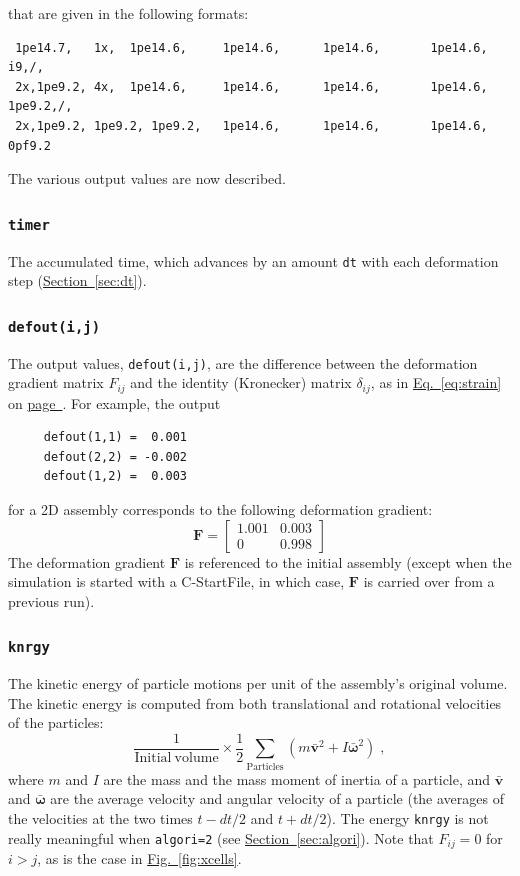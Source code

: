\documentclass[letterpaper,11pt]{article}
\newcommand{\StartFile}{\textsf{StartFile}}
\begin{document}
\normalsize\normalfont
\rule{0ex}{3ex}that are given in the following formats:\\[-2ex]
\footnotesize\normalfont
\begin{verbatim}
 1pe14.7,   1x,  1pe14.6,     1pe14.6,      1pe14.6,       1pe14.6,       i9,/,
 2x,1pe9.2, 4x,  1pe14.6,     1pe14.6,      1pe14.6,       1pe14.6,   1pe9.2,/,
 2x,1pe9.2, 1pe9.2, 1pe9.2,   1pe14.6,      1pe14.6,       1pe14.6,   0pf9.2
\end{verbatim}
\normalsize\normalfont
\rule{0ex}{3ex}The various output values are now described.
%
\subsubsection{\texttt{timer}}
The accumulated time, which advances by an amount \texttt{dt} with each
deformation step
(\hyperref[sec:dt]{Section~\ref*{sec:dt}}).
%
\subsubsection{\texttt{defout(i,j)}}\label{sec:defout}
The output values, \texttt{defout(i,j)}, are the difference
between the deformation gradient matrix $F_{ij}$ and the
identity (Kronecker) matrix $\delta_{ij}$, as in
\hyperref[eq:strain]{Eq.~\ref*{eq:strain}} on
\hyperref[eq:strain]{page~\pageref*{eq:strain}}.
For example, the output
\begin{verbatim}
     defout(1,1) =  0.001
     defout(2,2) = -0.002
     defout(1,2) =  0.003
\end{verbatim}
for a 2D assembly corresponds to the following deformation gradient:
\begin{equation}
\mathbf{F} = \left[
\begin{array}{cc}
1.001 & 0.003\\
0     & 0.998
\end{array}
\right]
\end{equation}
The deformation gradient $\mathbf{F}$ is referenced to the initial
assembly (except when the simulation is started with
a C-\StartFile, in which case, $\mathbf{F}$ is carried over
from a previous run).
%
\subsubsection{\texttt{knrgy}}
The kinetic energy of particle motions per unit of the assembly's 
original volume.  
The kinetic energy is computed from both 
translational and rotational velocities of the particles:
\begin{equation}
\frac{1}{\mathrm{Initial\ volume}}
\times
\frac{1}{2}
\sum_{\text{Particles}} \left(
m \bar{\mathbf{v}}^{2} + I \bar{\boldsymbol{\omega}}^{2}
\right)\;,
\end{equation}
where $m$ and $I$ are the mass and the mass moment of inertia of a particle, 
and $\bar{\mathbf{v}}$ and $\bar{\boldsymbol{\omega}}$ are the
average velocity and angular velocity of a particle 
(the averages of the velocities at the two times
$t-dt/2$ and $t+dt/2$).
The energy \texttt{knrgy} is not really meaningful
when \texttt{algori=2}
(see \hyperref[sec:algori]{Section~\ref*{sec:algori}}).
Note that $F_{ij}=0$ for $i>j$, as is the case
in \hyperref[fig:xcells]{Fig.~\ref*{fig:xcells}}.
%
\end{document}
